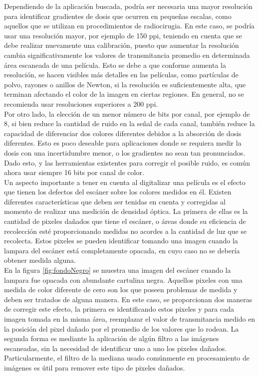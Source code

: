 Dependiendo de la aplicación buscada, podría ser necesaria una mayor resolución para identificar gradientes de dosis que ocurren en pequeñas escalas, como aquellos que se utilizan en procedimientos de radiocirugia. En este caso, se podría usar una resolución mayor, por ejemplo de 150 ppi, teniendo en cuenta que se debe realizar nuevamente una calibración, puesto que aumentar la resolución cambia significativamente los valores de transmitancia promedio en determinada área escaneada de una película. Esto se debe a que conforme aumenta la resolución, se hacen visibles más detalles en las películas, como partículas de polvo, rayones o anillos de Newton, si la resolución es suficientemente alta, que terminan afectando el color de la imagen en ciertas regiones. En general, no se recomienda usar resoluciones superiores a 200 ppi.\cite{Devic2016}\\

Por otro lado, la elección de un menor número de bits por canal, por ejemplo de 8, si bien reduce la cantidad de ruido en la señal de cada canal, también reduce la capacidad de diferenciar dos colores diferentes debidos a la absorción de dosis diferentes. Esto es poco deseable para aplicaciones donde se requiera medir la dosis con una incertidumbre menor, o los gradientes no sean tan pronunciados. Dado esto, y las herramientas existentes para corregir el posible ruido, es común ahora usar siempre 16 bits por canal de color.\\

Un aspecto importante a tener en cuenta al digitalizar una película es el efecto que tienen los defectos del escáner sobre los colores medidos en él. Existen diferentes características que deben ser tenidas en cuenta y corregidas al momento de realizar una medición de densidad óptica. La primera de ellas es la cantidad de pixeles dañados que tiene el escáner, o áreas donde su eficiencia de recolección esté proporcionando medidas no acordes a la cantidad de luz que se recolecta. Estos pixeles se pueden identificar tomando una imagen cuando la lampara del escáner está completamente opacada, en cuyo caso no se debería obtener medida alguna.  \\

En la figura \ref{fig:fondoNegro} se muestra una imagen del escáner cuando la lampara fue opacada con abundante cartulina negra. Aquellos pixeles con una medida de color diferente de cero son los que poseen problemas de medida y deben ser tratados de alguna manera. En este caso, se proporcionan dos maneras de corregir este efecto, la primera es identificando estos pixeles y para cada imagen tomada en la misma área, reemplazar el valor de transmitancia medido en la posición del pixel dañado por el promedio de los valores que lo rodean. La segunda forma es mediante la aplicación de algún filtro a las imágenes escaneadas, sin la necesidad de identificar uno a uno los pixeles dañados. Particularmente, el filtro de la mediana usado comúnmente en procesamiento de imágenes es útil para remover este tipo de pixeles dañados.\\ 

